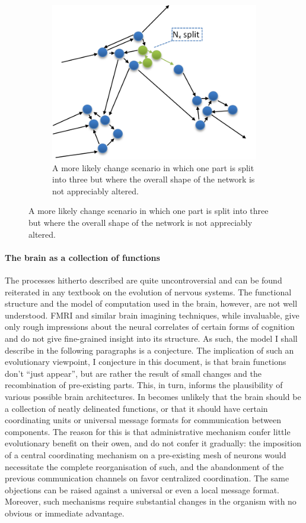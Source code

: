 \documentclass[]{scrartcl}
\theoremstyle{break}
\begin{document}
\begin{figure}
\begin{subfigure}[t]{0.45\textwidth}
		\includegraphics[width=\textwidth]{figs/likelyEvolution.png}
		\caption{A more likely change scenario in which one part is split into three but where the overall shape of the network is not appreciably altered.}
		\label{fig:likelyEvolution}
	\end{subfigure}
\end{figure}

\paragraph{The brain as a collection of functions}

The processes hitherto described are quite uncontroversial and can be found reiterated in any textbook on the evolution of nervous systems. The functional structure and the model of computation used in the brain, however, are not well understood. FMRI and similar brain imagining techniques, while invaluable, give only rough impressions about the neural correlates of certain forms of cognition and do not give fine-grained insight into its structure. As such, the model I shall describe in the following paragraphs is a conjecture. The implication of such an evolutionary viewpoint, I conjecture in this document, is that brain functions don't ``just appear'', but are rather the result of small changes and the recombination of pre-existing parts. This, in turn, informs the plausibility of various possible brain architectures. In becomes unlikely that the brain should be a collection of neatly delineated functions, or that it should have certain coordinating units or universal message formats for communication between components. The reason for this is that administrative mechanism confer little evolutionary benefit on their owen, and do not confer it gradually: the imposition of a central coordinating mechanism on a pre-existing mesh of neurons would necessitate the complete reorganisation of such, and the abandonment of the previous communication channels on favor centralized coordination. The same objections can be raised against a universal or even a local message format. Moreover, such mechanisms require substantial changes in the organism with no obvious or immediate advantage.
\end{document}
